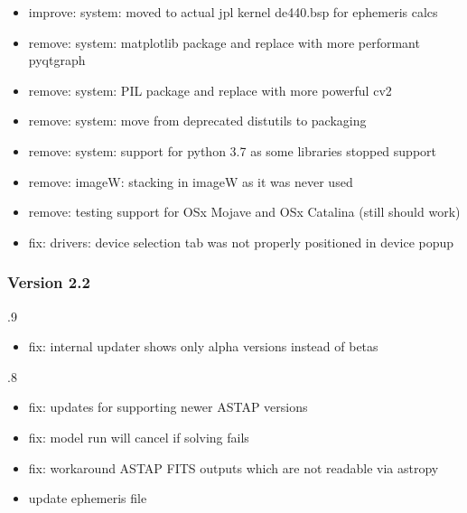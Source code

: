 \documentclass[a4paper,10pt,english]{sphinxmanual}
\begin{document}
\begin{itemize}
\item {} 
\sphinxAtStartPar
improve: system: moved to actual jpl kernel de440.bsp for ephemeris calcs

\item {} 
\sphinxAtStartPar
remove: system: matplotlib package and replace with more performant pyqtgraph

\item {} 
\sphinxAtStartPar
remove: system: PIL package and replace with more powerful cv2

\item {} 
\sphinxAtStartPar
remove: system: move from deprecated distutils to packaging

\item {} 
\sphinxAtStartPar
remove: system: support for python 3.7 as some libraries stopped support

\item {} 
\sphinxAtStartPar
remove: imageW: stacking in imageW as it was never used

\item {} 
\sphinxAtStartPar
remove: testing support for OSx Mojave and OSx Catalina (still should work)

\item {} 
\sphinxAtStartPar
fix: drivers: device selection tab was not properly positioned in device popup

\end{itemize}


\subsubsection{Version 2.2}
\label{\detokenize{changelog/changelog:version-2-2}}
.9
\begin{itemize}
\item {} 
\sphinxAtStartPar
fix: internal updater shows only alpha versions instead of betas

\end{itemize}

.8
\begin{itemize}
\item {} 
\sphinxAtStartPar
fix: updates for supporting newer ASTAP versions

\item {} 
\sphinxAtStartPar
fix: model run will cancel if solving fails

\item {} 
\sphinxAtStartPar
fix: workaround ASTAP FITS outputs which are not readable via astropy

\item {} 
\sphinxAtStartPar
update ephemeris file

\end{itemize}
\end{document}
